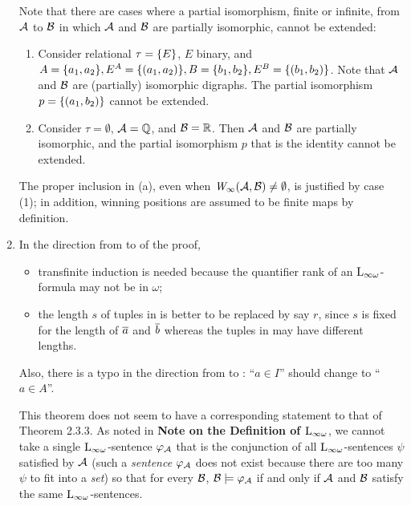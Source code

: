 \begin{enumerate}[1.]
\begin{remark}
Note that there are cases where a partial isomorphism, finite or infinite, from $\mathcal{A}$ to $\mathcal{B}$ in which $\mathcal{A}$ and $\mathcal{B}$ are partially isomorphic, cannot be extended:
\begin{enumerate}[(1)]
\item Consider relational $\tau = {\{E\}}$, $E$ binary, and $A = {\{a_1, a_2\}}, E^{A} = {\{(a_1, a_2)\}}, B = {\{b_1, b_2\}}, E^{B} = {\{(b_1, b_2)\}}$. Note that $\mathcal{A}$ and $\mathcal{B}$ are (partially) isomorphic digraphs. The partial isomorphism $p = {\{(a_1, b_2)\}}$ cannot be extended.
\item Consider $\tau = \emptyset$, $\mathcal{A} = \mathbb{Q}$, and $\mathcal{B} = \mathbb{R}$. Then $\mathcal{A}$ and $\mathcal{B}$ are partially isomorphic, and the partial isomorphism $p$ that is the identity cannot be extended.
\end{enumerate}
The proper inclusion in (a), even when $\winpos{\infty}(\strct{A}, \strct{B}) \neq \emptyset$, is justified by case (1); in addition, winning positions are assumed to be finite maps by definition.
\end{remark}
%
\item {} In the direction from  to  of the proof,
\begin{itemize}
\item transfinite induction is needed because the quantifier rank of an $\inflog$-formula may not be in $\omega$;
\item the length $s$ of tuples in  is better to be replaced by say $r$, since $s$ is fixed for the length of $\overline{a}$ and $\overline{b}$ whereas the tuples in  may have different lengths.
\end{itemize}
Also, there is a typo in the direction from  to : ``$a \in I$'' should change to ``$a \in A$''.

\begin{remark}
This theorem does not seem to have a corresponding statement  to that of Theorem 2.3.3. As noted in \textbf{Note on the Definition of $\inflog$}, we cannot take a single $\inflog$-sentence $\varphi_{\mathcal{A}}$ that is the conjunction of all $\inflog$-sentences $\psi$ satisfied by $\mathcal{A}$ (such a \emph{sentence} $\varphi_{\mathcal{A}}$ does not exist because there are too many $\psi$ to fit into a \emph{set}) so that for every $\mathcal{B}$, $\mathcal{B} \models \varphi_{\mathcal{A}}$ if and only if $\mathcal{A}$ and $\mathcal{B}$ satisfy the same $\inflog$-sentences.


\end{remark}
\end{enumerate}
